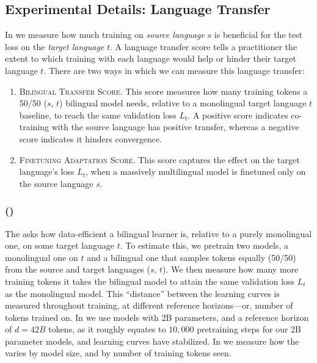 \subsection{Experimental Details: Language Transfer}
\label{app:language-transfer-details}

In  we measure how much training on \emph{source language} $s$ is beneficial for the test loss on the \emph{target language} $t$.
A language transfer score tells a practitioner the extent to which training with each language would help or hinder their target language $t$.
There are two ways in which we can measure this language transfer:

\begin{enumerate}[noitemsep]

    \item \textsc{Bilingual Transfer Score.} This score measures how many training tokens a 50/50 ($s$, $t$) bilingual model needs, relative to a monolingual target language $t$ baseline, to reach the same validation loss $L_t$. A positive score indicates co-training with the source language has positive transfer, whereas a negative score indicates it hinders convergence.

    \item \textsc{Finetuning Adaptation Score.} This score captures the effect on the target language's loss $L_t$, when a massively multilingual model is finetuned only on the source language $s$. 

\end{enumerate}

\subsubsection{\bts{} (\btsabb)}

The \bts{} asks how data-efficient a bilingual learner is, relative to a purely monolingual one, on some target language $t$.
To estimate this, we pretrain two models, a monolingual one on $t$ and a bilingual one that samples tokens equally (50/50) from the source and target languages ($s$, $t$).
We then measure how many more training tokens it takes the bilingual model to attain the same validation loss $L_t$ as the monolingual model.
This ``distance'' between the learning curves is measured throughout training, at different reference horizons---or, number of tokens trained on.
In  we use models with 2B parameters, and a reference horizon of $d\!=\!42B$ tokens, as it roughly equates to $10,000$ pretraining steps for our 2B parameter models, and learning curves have stabilized.
In  we measure how the \btsabb{} varies by model size, and by number of training tokens seen.

